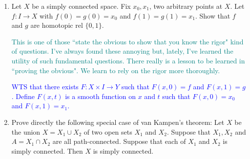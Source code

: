 \documentclass[12pt,a4paper]{report}
\newcommand{\BLUE}[1]{\textcolor{blue}{#1}}
\newcommand{\TEAL}[1]{\textcolor{teal}{#1}}
\begin{document}
\begin{enumerate}[label=2.7.\arabic*]
\BLUE{\begin{enumerate}[label=(\roman*)]
	\item $X \times D$ is a covering space of $X$.\\
	$p: X\times D \to X$ that is $p(x,d)=x$ where every open set $U \subset X$ is mapped to an open set, i.e., discrete point, $d \in D$.
	\item $p:\R \to S^1 \equiv e^{2\pi it}$ \\ That is for $t \in \R$, $p(t)$ is a point on a circle.  However, $p{-1}(U)$ for an open set $U \in S^1$ (i.e., a portion of the circle) maps to a many open sets (infinitely many open sets) all surrounding the same fraction.  That is, $t = 4\frac{1}{3}$ then $p^{-1}(e^{2\pi i 4\frac{1}{3}}) = \{ \dots, \frac{1}{3}, 2\frac{1}{3}, 3\frac{1}{3}, \dots\}$ and the open sets $V_i$ surrounding each of these points.  Each $V_i$ is homeomorphic to ther others.
	\item $p: S^1 \to S^1$, $p(z)=z^n$.\\
		That is given a point $z$ on the circle $S^1$	, then $p(z) = z^n$ and any open set $U\subset S^1$ (a segment) around $z^n$ then $p^{-1}(U)$ will be open set in $S^1$ surrounding $z$.
	\item $p:G \to H/G$
	\item Hausdorff space.
\end{enumerate}
}

\item Let $X$ be a simply connected space.  Fix $x_0, x_1$, two arbitrary points at $X$.  Let $f:I\to X$ with $f(0)=g(0)=x_0$ and $f(1)=g(1)=x_1$.  Show that $f$ and $g$ are homotopic rel $\{0,1\}$.

\TEAL{This is one of those ``state the obvious to show that you know the rigor" kind of questions.  I've always found these annoying but, lately, I've learned the utility of such fundamental questions.  There really is a lesson to be learned in ``proving the obvious".  We learn to rely on the rigor more thoroughly.
}

\BLUE{WTS that there exists $F: X \times I \to Y$ such that $F(x, 0) = f$ and $F(x,1) = g$.  Define $F(x, t)$ is a smooth function on $x$ and $t$ such that $F(x,0)=x_0$ and $F(x,1) = x_1$.
}

\item Prove directly the following special case of van Kampen's theorem:  Let $X$ be the union $X = X_1\cup X_2$ of two open sets $X_1$ and $X_2$.  Suppose that $X_1, X_2$ and $A=X_1\cap X_2$ are all path-connected.  Suppose that each of $X_1$ and $X_2$ is simply connected.  Then $X$ is simply connected.


\end{enumerate}
\end{document}
